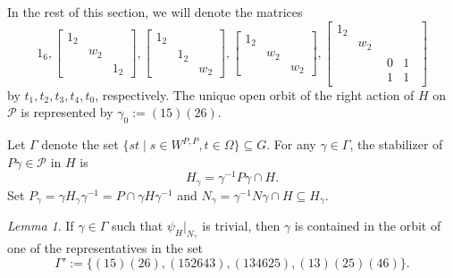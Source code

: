 \documentclass[12pt]{amsart}
\theoremstyle{Theorem}
\theoremstyle{Theorem}
\theoremstyle{Theorem}
\theoremstyle{Theorem}
\theoremstyle{Plain}
\theoremstyle{remark}
\theoremstyle{remark}
\theoremstyle{Definition}
\newtheorem{lemd}[dfn]{Lemma}
\begin{document}
In the rest of this section, we will denote the matrices
\[
    1_6,
    \begin{bmatrix}
        1_2 &     &    \\
            & w_2 &    \\
            &     & 1_2
    \end{bmatrix}
    ,
    \begin{bmatrix}
        1_2 &     &    \\
            & 1_2 &    \\
            &     & w_2
    \end{bmatrix}
    ,
    \begin{bmatrix}
        1_2 &     &    \\
            & w_2 &    \\
            &     & w_2
    \end{bmatrix}
    ,
    \begin{bmatrix}
        1_2 &     &   \\
            & w_2 &   \\
            &     &
        \begin{matrix}
            0 & 1\\
            1 & 1
        \end{matrix}
    \end{bmatrix}
\]
by $ t_1, t_2, t_3, t_4, t_0 $, respectively. The unique open orbit of the right action of $H$ on $\mathcal{P}$ is represented by $ \gamma_0 := (15) (26) $. 

Let $\Gamma$ denote the set $ \{ st \mid s \in W^{P, P}, t \in \Omega \} \subseteq G $. For any $ \gamma \in \Gamma $, the stabilizer of $ P \gamma \in \mathcal{P} $ in $H$ is
\[
    H_{ \gamma } = \gamma^{-1} P \gamma \cap H.
\]
Set $ P_\gamma = \gamma H_\gamma \gamma^{-1} = P \cap \gamma H \gamma^{-1} $ and $ N_\gamma = \gamma^{-1} N \gamma \cap H \subseteq H_\gamma $. 

\begin{lemd}
    \label{truestabilizer}
    If $ \gamma \in \Gamma $ such that $ { \psi_H }|_{ N_\gamma } $ is trivial, then $\gamma$ is contained in  the orbit of one of the representatives in the set
    \[
        \Gamma' := \{ (15)(26), (152643), (134625), (13)(25)(46) \}.
    \]
\end{lemd}
\end{document}
